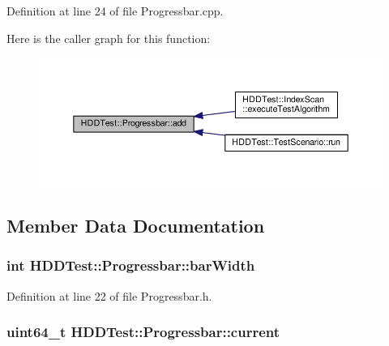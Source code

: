 Definition at line 24 of file Progressbar.\-cpp.



Here is the caller graph for this function\-:
\nopagebreak
\begin{figure}[H]
\begin{center}
\leavevmode
\includegraphics[width=350pt]{class_h_d_d_test_1_1_progressbar_a031bb6b1e7a3305d441bc10353c37966_icgraph}
\end{center}
\end{figure}




\subsection{Member Data Documentation}
\hypertarget{class_h_d_d_test_1_1_progressbar_a754f1137a1b68fced60aebfc87269a84}{
\subsubsection[{bar\-Width}]{\setlength{\rightskip}{0pt plus 5cm}int H\-D\-D\-Test\-::\-Progressbar\-::bar\-Width}}\label{class_h_d_d_test_1_1_progressbar_a754f1137a1b68fced60aebfc87269a84}


Definition at line 22 of file Progressbar.\-h.

\hypertarget{class_h_d_d_test_1_1_progressbar_a8064f75e6a8ad05753bbff8752d6a5a7}{
\subsubsection[{current}]{\setlength{\rightskip}{0pt plus 5cm}uint64\-\_\-t H\-D\-D\-Test\-::\-Progressbar\-::current}}\label{class_h_d_d_test_1_1_progressbar_a8064f75e6a8ad05753bbff8752d6a5a7}


